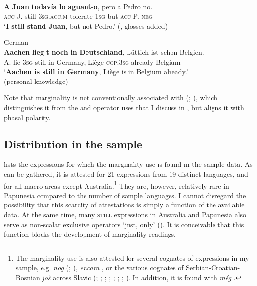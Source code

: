 \begin{exe}
	\ex\label{exMarginalSectionIntro1}\\
	\gll \textbf{A} \textbf{Juan} \textbf{todavía} \textbf{lo} \textbf{aguant}-\textbf{o}, pero a Pedro no.\\
	\textsc{acc} J. still 3\textsc{sg}.\textsc{acc}.\textsc{m} tolerate-1\textsc{sg} but \textsc{acc} P. \textsc{neg}\\
	\glt \lq \textbf{I still stand Juan}, but not Pedro.' (\cite[3]{EderlyCurco2016}, glosses added)

	\ex\label{exMarginalSectionIntro2}German\\
	\gll \textbf{Aachen} \textbf{lieg}-\textbf{t} \textbf{noch} \textbf{in} \textbf{Deutschland}, Lüttich ist schon Belgien.\\
	A. lie-3\textsc{sg} still in Germany, Liège \textsc{cop}.3\textsc{sg} already Belgium\\
	\glt \lq \textbf{Aachen is still in Germany}, Liège is in Belgium already.'
	\\(personal knowledge)
\end{exe}

Note that marginality is not conventionally associated with  (\cite[276]{Grosz2012}; \cite[151–152]{Koenig1991}), which distinguishes it from the  and  operator uses that I discuss in , but aligns it with phasal polarity.

\subsection[tocentry={}]{Distribution in the sample}
 lists the expressions for which the marginality use is found in the sample data. As can be gathered, it is attested for 21 expressions from 19 distinct languages, and for all macro-areas except Australia.\footnote{The marginality use is also attested for several cognates of expressions in my sample, e.g.  \textit{nog} (\cite{Rombouts1979}; \cite{Vandeweghe1984}),  \textit{encara}  \parencite{PerezSaldanyaSalvador1995}, or the various cognates of Serbian-Croatian-Bosnian \textit{još} across Slavic (\cite{Bogacki1993}; \cite[s.v. \textit{ešte}]{SSSJ}; \cite[s.v. \textit{jeszcze}]{PWN}; \cite[s.v. \textit{ješte}]{SSJC};  \cite[s.v. \textit{ще}]{CYM11}; \cite[s.v. \textit{ešte}]{KSS4}; \cite{Komarek1979}; \cite{Mustajoki1988}). In addition, it is found with  \textit{még} \parencite{CsirmazSlade2020}.}  They are, however, relatively rare in Papunesia compared to the number of sample languages. I cannot disregard the possibility that this scarcity of attestations is simply a function of the available data. At the same time, many \textsc{still} expressions in Australia and Papunesia also serve as non-scalar exclusive operators \lq just, only' (). It is conceivable that this  function blocks the development of marginality readings.

